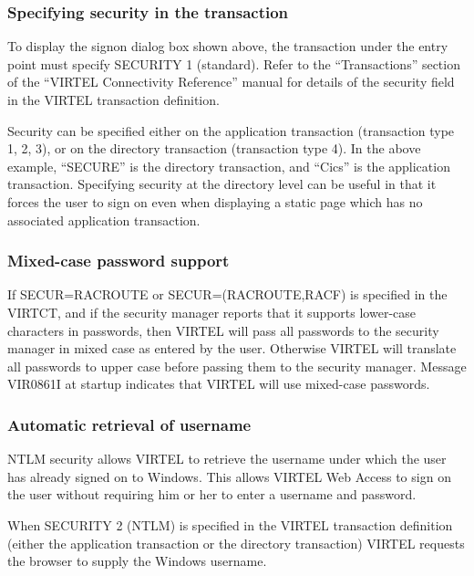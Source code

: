 \documentclass[letterpaper,10pt,english]{sphinxmanual}
\begin{document}



\subsubsection{Specifying security in the transaction}
\label{\detokenize{User_Guide:specifying-security-in-the-transaction}}
To display the signon dialog box shown above, the transaction under the entry point must specify SECURITY 1
(standard). Refer to the “Transactions” section of the “VIRTEL Connectivity Reference” manual for details of the
security field in the VIRTEL transaction definition.

Security can be specified either on the application transaction (transaction type 1, 2, 3), or on the directory transaction
(transaction type 4). In the above example, “SECURE” is the directory transaction, and “Cics” is the application
transaction. Specifying security at the directory level can be useful in that it forces the user to sign on even when
displaying a static page which has no associated application transaction.


\subsubsection{Mixed-case password support}
\label{\detokenize{User_Guide:mixed-case-password-support}}
If SECUR=RACROUTE or SECUR=(RACROUTE,RACF) is specified in the VIRTCT, and if the security manager reports that it
supports lower-case characters in passwords, then VIRTEL will pass all passwords to the security manager in mixed
case as entered by the user. Otherwise VIRTEL will translate all passwords to upper case before passing them to the
security manager. Message VIR0861I at startup indicates that VIRTEL will use mixed-case passwords.


\subsubsection{Automatic retrieval of username}
\label{\detokenize{User_Guide:automatic-retrieval-of-username}}
NTLM security allows VIRTEL to retrieve the username under which the user has already signed on to Windows. This
allows VIRTEL Web Access to sign on the user without requiring him or her to enter a username and password.

When SECURITY 2 (NTLM) is specified in the VIRTEL transaction definition (either the application transaction or the
directory transaction) VIRTEL requests the browser to supply the Windows username.
\end{document}
